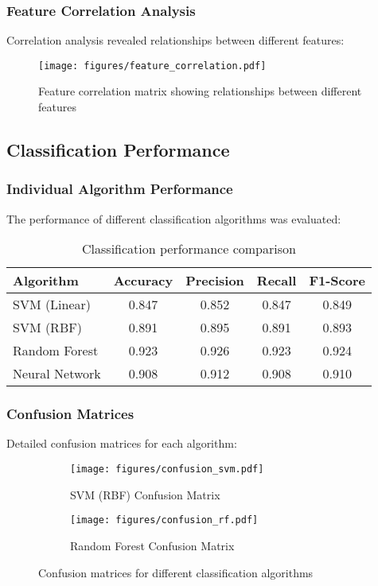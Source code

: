 \subsubsection{Feature Correlation Analysis}

Correlation analysis revealed relationships between different features:

\begin{figure}[H]
\centering
\texttt{[image: figures/feature\_correlation.pdf]}
\caption{Feature correlation matrix showing relationships between different features}
\label{fig:feature_correlation}
\end{figure}

\subsection{Classification Performance}

\subsubsection{Individual Algorithm Performance}

The performance of different classification algorithms was evaluated:

\begin{table}[H]
\centering
\caption{Classification performance comparison}
\label{tab:classification_performance}
\begin{tabular}{@{}lcccc@{}}
\toprule
Algorithm & Accuracy & Precision & Recall & F1-Score \\
\midrule
SVM (Linear) & 0.847 & 0.852 & 0.847 & 0.849 \\
SVM (RBF) & 0.891 & 0.895 & 0.891 & 0.893 \\
Random Forest & 0.923 & 0.926 & 0.923 & 0.924 \\
Neural Network & 0.908 & 0.912 & 0.908 & 0.910 \\
\bottomrule
\end{tabular}
\end{table}

\subsubsection{Confusion Matrices}

Detailed confusion matrices for each algorithm:

\begin{figure}[H]
\centering
\begin{subfigure}{0.45\textwidth}
\centering
\texttt{[image: figures/confusion\_svm.pdf]}
\caption{SVM (RBF) Confusion Matrix}
\end{subfigure}
\hfill
\begin{subfigure}{0.45\textwidth}
\centering
\texttt{[image: figures/confusion\_rf.pdf]}
\caption{Random Forest Confusion Matrix}
\end{subfigure}
\caption{Confusion matrices for different classification algorithms}
\label{fig:confusion_matrices}
\end{figure}


